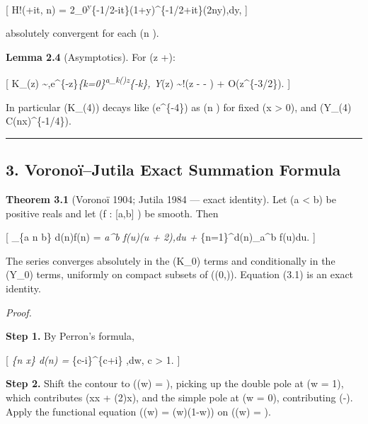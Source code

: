 \documentclass[
]{article}
\begin{document}
{[} H!\left(+it, n\right) =
2\int\_0\textsuperscript{\infty y}\{-1/2-it\}(1+y)\^{}\{-1/2+it\}\cos(2\pi ny),dy,
 {]}

absolutely convergent for each (n ).

\textbf{Lemma 2.4} (Asymptotics). For (z \to +\infty):

{[} K\_\nu(z)
\sim {},e\^{}\{-z\}\sum\emph{\{k=0\}\textsuperscript{\infty a\_k(\nu)z}\{-k\},
\qquad Y}\nu(z) \sim {}\sin!\left(z -
 - \right) + O(z\^{}\{-3/2\}). {]}

In particular (K\_\nu(4\pi{})) decays like
(e\^{}\{-4\pi{}\}) as (n \to \infty) for fixed (x \textgreater{}
0), and (\textbar Y\_\nu(4\pi{})\textbar{}
\le C(nx)\^{}\{-1/4\}).

\begin{center}\rule{0.5\linewidth}{0.5pt}\end{center}

\subsection{3. Voronoï--Jutila Exact Summation
Formula}\label{voronouxefjutila-exact-summation-formula}

\textbf{Theorem 3.1} (Voronoï 1904; Jutila 1984 --- exact identity). Let
(a \textless{} b) be positive reals and let (f : {[}a,b{]}
\to {}) be smooth. Then

{[} \sum\_\{a \le n \le b\} d(n)f(n) = \int\emph{a\^{}b
f(u)(\log u + 2\gamma),du + \sum}\{n=1\}\^{}\infty d(n)\int\_a\^{}b
f(u)du.
 {]}

The series converges absolutely in the (K\_0) terms and conditionally in
the (Y\_0) terms, uniformly on compact subsets of ((0,\infty)). Equation
(3.1) is an exact identity.

\emph{Proof.}

\textbf{Step 1.} By Perron's formula,

{[} \sum\emph{\{n \le x\} d(n) =
\int}\{c-i\infty\}\^{}\{c+i\infty\}
,dw, \qquad c \textgreater{} 1. {]}

\textbf{Step 2.} Shift the contour to ((w) = ),
picking up the double pole at (w = 1), which contributes (x\log x +
(2)x), and the simple pole at (w = 0), contributing
(-). Apply the functional equation (\zeta(w) =
\chi(w)\zeta(1-w)) on ((w) = ).
\end{document}
